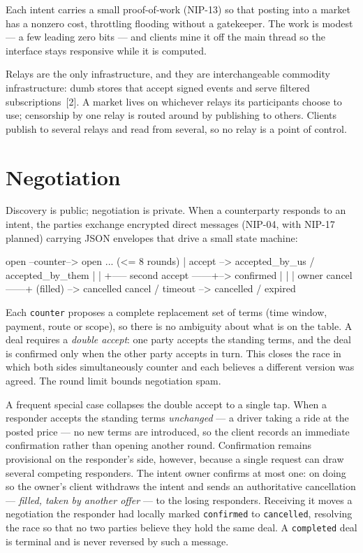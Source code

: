 \documentclass[11pt]{article}
\begin{document}
Each intent carries a small proof-of-work (NIP-13) so that posting into a
market has a nonzero cost, throttling flooding without a gatekeeper. The work
is modest --- a few leading zero bits --- and clients mine it off the main
thread so the interface stays responsive while it is computed.

Relays are the only infrastructure, and they are interchangeable commodity
infrastructure: dumb stores that accept signed events and serve filtered
subscriptions~[2]. A market lives on whichever relays its participants
choose to use; censorship by one relay is routed around by publishing to
others. Clients publish to several relays and read from several, so no relay
is a point of control.

\section{Negotiation}

Discovery is public; negotiation is private. When a counterparty responds to
an intent, the parties exchange encrypted direct messages (NIP-04, with
NIP-17 planned) carrying JSON envelopes that drive a small state machine:

\begin{code}
open --counter--> open ... (<= 8 rounds)
  |
accept --> accepted_by_us / accepted_by_them
  |                          |
  +----- second accept ------+--> confirmed
  |                                  |
  |               owner cancel ------+ (filled) --> cancelled
cancel / timeout --> cancelled / expired
\end{code}

Each \texttt{counter} proposes a complete replacement set of terms (time
window, payment, route or scope), so there is no ambiguity about what is on
the table. A deal requires a \emph{double accept}: one party accepts the
standing terms, and the deal is confirmed only when the other party accepts
in turn. This closes the race in which both sides simultaneously counter and
each believes a different version was agreed. The round limit bounds
negotiation spam.

A frequent special case collapses the double accept to a single tap. When a
responder accepts the standing terms \emph{unchanged} --- a driver taking a
ride at the posted price --- no new terms are introduced, so the client
records an immediate confirmation rather than opening another round.
Confirmation remains provisional on the responder's side, however, because a
single request can draw several competing responders. The intent owner
confirms at most one: on doing so the owner's client withdraws the intent and
sends an authoritative cancellation --- \emph{filled, taken by another offer}
--- to the losing responders. Receiving it moves a negotiation the responder
had locally marked \texttt{confirmed} to \texttt{cancelled}, resolving the
race so that no two parties believe they hold the same deal. A
\texttt{completed} deal is terminal and is never reversed by such a message.
\end{document}
